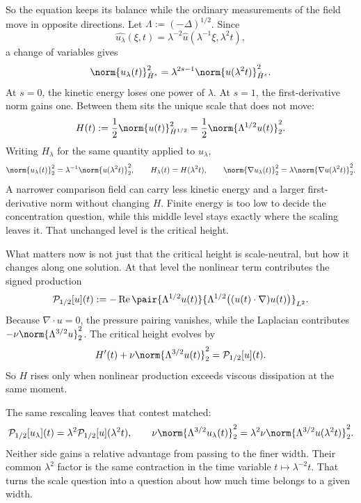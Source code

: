 So the equation keeps its balance while the ordinary measurements of the field move in opposite directions. Let \(\Lambda:=(-\Delta)^{1/2}\). Since
\[
  \widehat{u_\lambda}(\xi,t)
  =
  \lambda^{-2}\widehat u(\lambda^{-1}\xi,\lambda^2t),
\]
a change of variables gives
\[
  \norm{u_\lambda(t)}_{\dot H^s}^2
  =
  \lambda^{2s-1}
  \norm{u(\lambda^2t)}_{\dot H^s}^2.
\]
At \(s=0\), the kinetic energy loses one power of \(\lambda\). At \(s=1\), the first-derivative norm gains one. Between them sits the unique scale that does not move:
\[
  H(t)
  :=
  \frac12\norm{u(t)}_{\dot H^{1/2}}^2
  =
  \frac12\norm{\Lambda^{1/2}u(t)}_2^2.
\]
Writing \(H_\lambda\) for the same quantity applied to \(u_\lambda\),
\[
  \norm{u_\lambda(t)}_2^2
  =
  \lambda^{-1}\norm{u(\lambda^2t)}_2^2,
  \qquad
  H_\lambda(t)=H(\lambda^2t),
  \qquad
  \norm{\nabla u_\lambda(t)}_2^2
  =
  \lambda\norm{\nabla u(\lambda^2t)}_2^2.
\]
A narrower comparison field can carry less kinetic energy and a larger first-derivative norm without changing \(H\). Finite energy is too low to decide the concentration question, while this middle level stays exactly where the scaling leaves it. That unchanged level is the critical height.


What matters now is not just that the critical height is scale-neutral, but how it changes along one solution. At that level the nonlinear term contributes the signed production
\[
  \mathcal P_{1/2}[u](t)
  :=
  -\operatorname{Re}
  \pair
    {\Lambda^{1/2}u(t)}
    {\Lambda^{1/2}\bigl((u(t)\cdot\nabla)u(t)\bigr)}_{L^2}.
\]
Because \(\nabla\cdot u=0\), the pressure pairing vanishes, while the Laplacian contributes \(-\nu\norm{\Lambda^{3/2}u}_2^2\). The critical height evolves by
\[
  H'(t)
  +
  \nu\norm{\Lambda^{3/2}u(t)}_2^2
  =
  \mathcal P_{1/2}[u](t).
\]
So \(H\) rises only when nonlinear production exceeds viscous dissipation at the same moment.

The same rescaling leaves that contest matched:
\[
  \mathcal P_{1/2}[u_\lambda](t)
  =
  \lambda^2\mathcal P_{1/2}[u](\lambda^2t),
  \qquad
  \nu\norm{\Lambda^{3/2}u_\lambda(t)}_2^2
  =
  \lambda^2\nu\norm{\Lambda^{3/2}u(\lambda^2t)}_2^2.
\]
Neither side gains a relative advantage from passing to the finer width. Their common \(\lambda^2\) factor is the same contraction in the time variable \(t\mapsto\lambda^{-2}t\). That turns the scale question into a question about how much time belongs to a given width.


